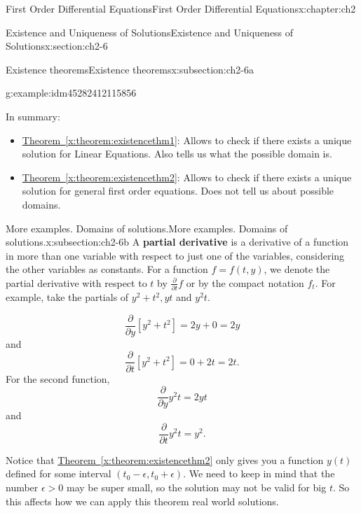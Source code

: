 \documentclass[oneside,10pt,]{book}
\newcommand{\terminology}[1]{\textbf{#1}}
\numberwithin{equation}{section}
\numberwithin{equation}{section}
\begin{document}
\begin{chapterptx}{First Order Differential Equations}{}{First Order Differential Equations}{}{}{x:chapter:ch2}
\begin{sectionptx}{Existence and Uniqueness of Solutions}{}{Existence and Uniqueness of Solutions}{}{}{x:section:ch2-6}
\begin{subsectionptx}{Existence theorems}{}{Existence theorems}{}{}{x:subsection:ch2-6a}
\begin{example}{}{g:example:idm45282412115856}
\end{example}
In summary:%
\begin{itemize}[label=\textbullet]
\item{}\hyperref[x:theorem:existencethm1]{Theorem~\ref{x:theorem:existencethm1}}: Allows to check if there exists a unique solution for Linear Equations. Also tells us what the possible domain is.%
\item{}\hyperref[x:theorem:existencethm2]{Theorem~\ref{x:theorem:existencethm2}}: Allows to check if there exists a unique solution for general first order equations. Does not tell us about possible domains.%
\end{itemize}
%
\end{subsectionptx}
%
%
\typeout{************************************************}
\typeout{************************************************}
%
\begin{subsectionptx}{More examples. Domains of solutions.}{}{More examples. Domains of solutions.}{}{}{x:subsection:ch2-6b}
A \terminology{partial derivative} is a derivative of a function in more than one variable with respect to just one of the variables, considering the other variables as constants. For a function \(f = f(t,y)\), we denote the partial derivative with respect to \(t\) by \(\frac{\partial}{\partial t} f\) or by the compact notation \(f_t\). For example, take the partials of \(y^{2}+t^{2},yt\) and \(y^{2}t\).%
\par
%
\begin{equation*}
\frac{\partial}{\partial y} [y^2 + t^2] = 2y + 0 = 2y
\end{equation*}
and%
\begin{equation*}
\frac{\partial}{\partial t} [y^2 + t^2] = 0 + 2t = 2t.
\end{equation*}
For the second function,%
\begin{equation*}
\frac{\partial}{\partial y} y^2 t = 2yt
\end{equation*}
and%
\begin{equation*}
\frac{\partial}{\partial t} y^2 t = y^2.
\end{equation*}
%
\par
Notice that \hyperref[x:theorem:existencethm2]{Theorem~\ref{x:theorem:existencethm2}} only gives you a function \(y(t)\) defined for some interval \(\left(t_{0}-\epsilon,t_{0}+\epsilon\right)\). We need to keep in mind that the number \(\epsilon>0\) may be super small, so the solution may not be valid for big \(t\). So this affects how we can apply this theorem real world solutions.%

\end{subsectionptx}
\end{sectionptx}
\end{chapterptx}
\end{document}
